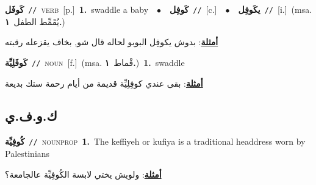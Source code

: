 \documentclass[10pt,a4paper,twoside]{article} %
\begin{document}
\begin{multicols}{2}
{\setlength\topsep{0pt}\textbf{\foreignlanguage{arabic}{كَوفَل}}\ {\color{gray}\texttt{//}\color{black}}\ \textsc{verb}\ [p.]\ \textbf{1.}~swaddle a baby\ \ $\bullet$\ \ \setlength\topsep{0pt}\textbf{\foreignlanguage{arabic}{كَوفِل}}\ {\color{gray}\texttt{//}\color{black}}\ [c.]\ \ $\bullet$\ \ \setlength\topsep{0pt}\textbf{\foreignlanguage{arabic}{يكَوفِل}}\ {\color{gray}\texttt{//}\color{black}}\ [i.]\ \color{gray}(msa. \foreignlanguage{arabic}{يُقَمِّط الطفل}~\foreignlanguage{arabic}{\textbf{١.}})\color{black}\  \begin{flushright}\color{gray}\foreignlanguage{arabic}{\textbf{\underline{\foreignlanguage{arabic}{أمثلة}}}: بدوش يكوفِل البوبو لحاله قال شو, بخاف يقزعله رقبته}\end{flushright}\color{black}} \vspace{2mm}

{\setlength\topsep{0pt}\textbf{\foreignlanguage{arabic}{كَوفَلِيِّة}}\ {\color{gray}\texttt{//}\color{black}}\ \textsc{noun}\ [f.]\ \color{gray}(msa. \foreignlanguage{arabic}{قْماط}~\foreignlanguage{arabic}{\textbf{١.}})\color{black}\ \textbf{1.}~swaddle\  \begin{flushright}\color{gray}\foreignlanguage{arabic}{\textbf{\underline{\foreignlanguage{arabic}{أمثلة}}}: بقى عندي كوفِلِيِّة قديمة من أيام رحمة ستك بديعة}\end{flushright}\color{black}} \vspace{2mm}

\vspace{-3mm}
\subsection*{\color{blue}\foreignlanguage{arabic}{ك.و.ف.ي}\color{blue}{}} 

{\setlength\topsep{0pt}\textbf{\foreignlanguage{arabic}{كُوفِيِّة}}\ {\color{gray}\texttt{//}\color{black}}\ \textsc{noun\textunderscore prop}\ \textbf{1.}~The keffiyeh or kufiya is a traditional headdress worn by Palestinians\  \begin{flushright}\color{gray}\foreignlanguage{arabic}{\textbf{\underline{\foreignlanguage{arabic}{أمثلة}}}: ولويش يختي لابسة الكُوفِيِّة عالجامعة؟}\end{flushright}\color{black}} \vspace{2mm}


\end{multicols}
\end{document}
